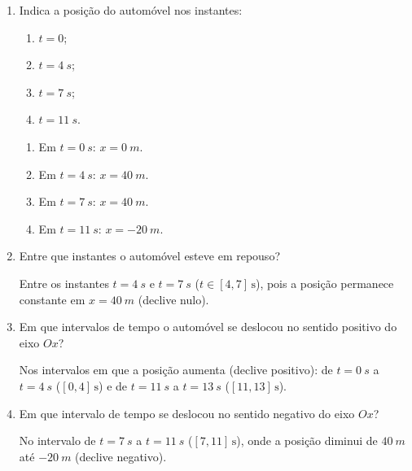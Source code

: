 \documentclass[11pt,a4paper]{article}
\begin{document}
	\begin{enumerate}[label=\textbf{\arabic*.}]
		
		\item Indica a posição do automóvel nos instantes:
		
		\begin{enumerate}[label=\alph*)]
			\item $t=0$;
			\item $t=\SI{4}{s}$;
			\item $t=\SI{7}{s}$;
			\item $t=\SI{11}{s}$.
		\end{enumerate}
		
		\begin{solucao}
			\begin{enumerate}[label=\alph*)]
				\item Em $t = \SI{0}{s}$: $x = \SI{0}{m}$.
				\item Em $t = \SI{4}{s}$: $x = \SI{40}{m}$.
				\item Em $t = \SI{7}{s}$: $x = \SI{40}{m}$.
				\item Em $t = \SI{11}{s}$: $x = \SI{-20}{m}$.
			\end{enumerate}
		\end{solucao}
		
		\item Entre que instantes o automóvel esteve em repouso?
		
		\begin{solucao}
			Entre os instantes $t = \SI{4}{s}$ e $t = \SI{7}{s}$ ($t \in [4, 7]\,\text{s}$), pois a posição permanece constante em $x = \SI{40}{m}$ (declive nulo).
		\end{solucao}
		
		\item Em que intervalos de tempo o automóvel se deslocou no sentido positivo
		do eixo $Ox$?
		
		\begin{solucao}
			Nos intervalos em que a posição aumenta (declive positivo): de $t = \SI{0}{s}$ a $t = \SI{4}{s}$ ($[0, 4]\,\text{s}$) e de $t = \SI{11}{s}$ a $t = \SI{13}{s}$ ($[11, 13]\,\text{s}$).
		\end{solucao}
		
		\item Em que intervalo de tempo se deslocou no sentido negativo do eixo
		$Ox$?
		
		\begin{solucao}
			No intervalo de $t = \SI{7}{s}$ a $t = \SI{11}{s}$ ($[7, 11]\,\text{s}$), onde a posição diminui de $\SI{40}{m}$ até $\SI{-20}{m}$ (declive negativo).
		\end{solucao}
		

\end{enumerate}
\end{document}
